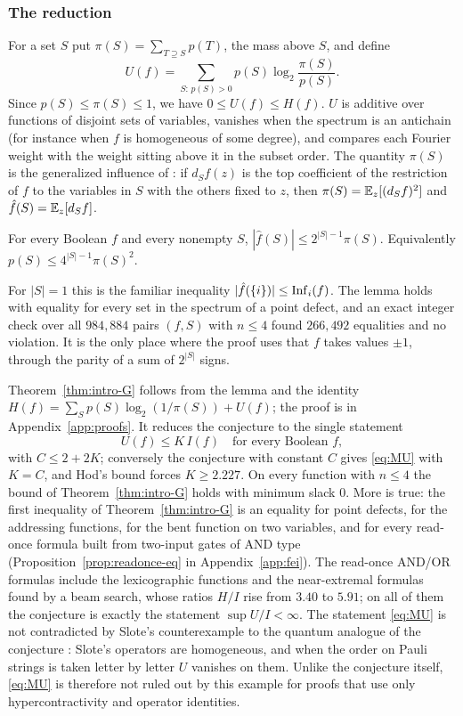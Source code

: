 \subsubsection*{The reduction}
For a set $S$ put $\pi(S)=\sum_{T\supseteq S}p(T)$, the mass above $S$, and define
\[
U(f)=\sum_{S:\,p(S)>0}p(S)\log_2\frac{\pi(S)}{p(S)}.
\]
Since $p(S)\le\pi(S)\le1$, we have $0\le U(f)\le H(f)$. $U$ is additive over functions of disjoint sets of variables, vanishes when the spectrum is an antichain (for instance when $f$ is homogeneous of some degree), and compares each Fourier weight with the weight sitting above it in the subset order. The quantity $\pi(S)$ is the generalized influence of \cite{KKLMS2020}: if $d_Sf(z)$ is the top coefficient of the restriction of $f$ to the variables in $S$ with the others fixed to $z$, then $\pi(S)=\mathbb{E}_z[(d_Sf)^2]$ and $\hat f(S)=\mathbb{E}_z[d_Sf]$.

\begin{lemma}\label{lem:Gkey}
For every Boolean $f$ and every nonempty $S$, $|\hat f(S)|\le 2^{|S|-1}\pi(S)$. Equivalently $p(S)\le4^{|S|-1}\pi(S)^2$. 
\end{lemma}

For $|S|=1$ this is the familiar inequality $|\hat f(\{i\})|\le\operatorname{Inf}_i(f)$. The lemma holds with equality for every set in the spectrum of a point defect, and an exact integer check over all $984{,}884$ pairs $(f,S)$ with $n\le4$ found $266{,}492$ equalities and no violation. It is the only place where the proof uses that $f$ takes values $\pm1$, through the parity of a sum of $2^{|S|}$ signs.

Theorem~\ref{thm:intro-G} follows from the lemma and the identity $H(f)=\sum_Sp(S)\log_2(1/\pi(S))+U(f)$; the proof is in Appendix~\ref{app:proofs}. It reduces the conjecture to the single statement
\begin{equation}\label{eq:MU}
U(f)\le K\,I(f)\quad\text{for every Boolean }f,
\end{equation}
with $C\le2+2K$; conversely the conjecture with constant $C$ gives \eqref{eq:MU} with $K=C$, and Hod's bound forces $K\ge2.227$. On every function with $n\le4$ the bound of Theorem~\ref{thm:intro-G} holds with minimum slack $0$. More is true: the first inequality of Theorem~\ref{thm:intro-G} is an equality for point defects, for the addressing functions, for the bent function on two variables, and for every read-once formula built from two-input gates of AND type (Proposition~\ref{prop:readonce-eq} in Appendix~\ref{app:fei}). The read-once AND/OR formulas include the lexicographic functions and the near-extremal formulas found by a beam search, whose ratios $H/I$ rise from $3.40$ to $5.91$; on all of them the conjecture is exactly the statement $\sup U/I<\infty$. The statement \eqref{eq:MU} is not contradicted by Slote's counterexample to the quantum analogue of the conjecture \cite{Slote2026}: Slote's operators are homogeneous, and when the order on Pauli strings is taken letter by letter $U$ vanishes on them. Unlike the conjecture itself, \eqref{eq:MU} is therefore not ruled out by this example for proofs that use only hypercontractivity and operator identities.

